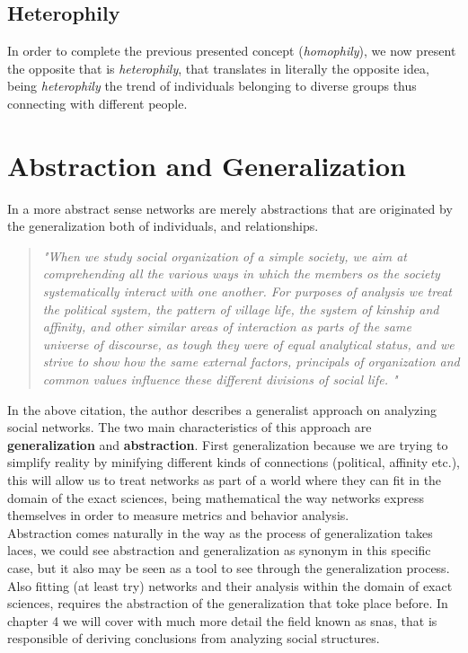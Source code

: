 \subsection*{Heterophily}

In order to complete the previous presented concept (\textit{homophily}), we now present the opposite that is \textit{heterophily}, that translates in literally the opposite idea, being \textit{heterophily} the trend of individuals belonging to diverse groups thus connecting with different people.


\section{Abstraction and Generalization}

In a more abstract sense networks are merely abstractions that are originated by the generalization both of individuals, and relationships.\\

\begin{quote}
\textit{"When we study social organization of a simple society, we aim at comprehending all the various ways in which the members os the society systematically interact with one another. For purposes of analysis we treat the political system, the pattern of village life, the system of kinship and affinity, and other similar areas of interaction as parts of the same universe of discourse, as tough they were of equal analytical status, and we strive to show how the same external factors, principals of organization and common values influence these different divisions of social life.
"}
\cite{barnes1954class}
\end{quote}

\indent In the above citation, the author describes a generalist approach on analyzing social networks. The two main characteristics of this approach are \textbf{generalization} and \textbf{abstraction}. First generalization because we are trying to simplify reality by minifying different kinds of connections (political, affinity etc.), this will allow us to treat networks as part of a world where they can fit in the domain of the exact sciences, being mathematical the way networks express themselves in order to measure metrics and behavior analysis.\\
\indent Abstraction comes naturally in the way as the process of generalization takes laces, we could see abstraction and generalization as synonym in this specific case, but it also may be seen as a tool to see through the generalization process. Also fitting (at least try) networks and their analysis within the domain of exact sciences, requires the abstraction of the generalization that toke place before. In chapter 4 we will cover with much more detail the field known as \glspl{sna}, that is responsible of deriving conclusions from analyzing social structures.
